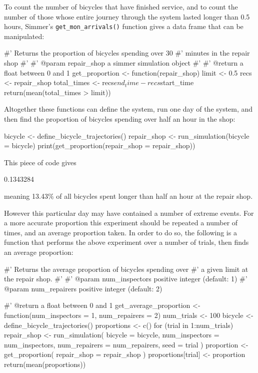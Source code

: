 To count the number of bicycles that have finished service, and to
count the number of those whose entire journey through the system lasted longer
than 0.5 hours, Simmer's \texttt{get_mon_arrivals()} function gives a
data frame that can be manipulated:

\begin{Rin}
#' Returns the proportion of bicycles spending over 30
#' minutes in the repair shop
#'
#' @param repair_shop a simmer simulation object
#'
#' @return a float between 0 and 1
get_proportion <- function(repair_shop) {
  limit <- 0.5
  recs <- repair_shop %
  total_times <- recs$end_time - recs$start_time
  return(mean(total_times > limit))
}
\end{Rin}

Altogether these functions can define the system, run one day of the system, and
then find the proportion of bicycles spending over half an hour in the shop:

\begin{Rin}
bicycle <- define_bicycle_trajectories()
repair_shop <- run_simulation(bicycle = bicycle)
print(get_proportion(repair_shop = repair_shop))
\end{Rin}

This piece of code gives

\begin{Rout}
[1] 0.1343284
\end{Rout}

meaning 13.43\% of all bicycles spent longer than half an hour at the repair
shop.

However this particular day may have contained a number of extreme events. For
a more accurate proportion this experiment should be repeated a number of times,
and an average proportion taken. In order to do so, the following is a function
that performs the above experiment over a number of trials, then finds an
average proportion:

\begin{Rin}
#' Returns the average proportion of bicycles spending over
#' a given limit at the repair shop.
#'
#' @param num_inspectors positive integer (default: 1)
#' @param num_repairers positive integer (default: 2)

#' @return a float between 0 and 1
get_average_proportion <- function(num_inspectors = 1,
                                   num_repairers = 2) {
  num_trials <- 100
  bicycle <- define_bicycle_trajectories()
  proportions <- c()
  for (trial in 1:num_trials) {
    repair_shop <- run_simulation(
      bicycle = bicycle,
      num_inspectors = num_inspectors,
      num_repairers = num_repairers,
      seed = trial
    )
    proportion <- get_proportion(
      repair_shop = repair_shop
    )
    proportions[trial] <- proportion
  }
  return(mean(proportions))
}
\end{Rin}

